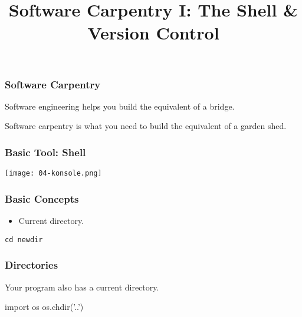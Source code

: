 
\makeatletter
\def\verbatim@font{\small\ttfamily}
\makeatother
\title{Software Carpentry I: The Shell \& Version Control}

\frame{\maketitle}

\begin{frame}[fragile]
\frametitle{Software Carpentry}

\alert{Software engineering} helps you build the equivalent of a bridge.

\medskip

\alert{Software carpentry} is what you need to build the equivalent of a garden shed.


\end{frame}

\begin{frame}[fragile]
\frametitle{Basic Tool: Shell}

\centering
\texttt{[image: 04-konsole.png]}

\end{frame}

\begin{frame}[fragile]
\frametitle{Basic Concepts}

\begin{itemize}
\item Current directory.
\end{itemize}

\texttt{cd newdir}

\end{frame}

\begin{frame}[fragile]
\frametitle{Directories}

Your program also has a current directory.

\begin{python}
import os
os.chdir('..')
\end{python}

\end{frame}

